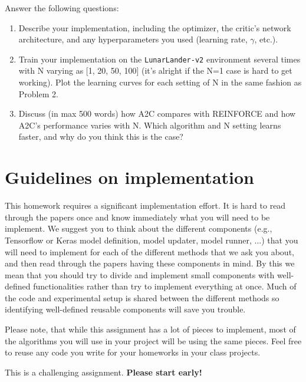 \documentclass[12pt]{article}
\begin{document}
Answer the following questions:
\begin{enumerate}
\item Describe your implementation, including the optimizer, the critic's network architecture, and any hyperparameters you used (learning rate, $\gamma$, etc.).

\item Train your implementation on the \texttt{LunarLander-v2} environment several times with N varying as [1, 20, 50, 100] (it's alright if the N=1 case is hard to get working). Plot the learning curves for each setting of N in the same fashion as Problem 2.

\item Discuss (in max 500 words) how A2C compares with REINFORCE and how A2C's performance varies with N. Which algorithm and N setting learns faster, and why do you think this is the case? 
\end{enumerate}

\section*{Guidelines on implementation}

This homework requires a significant implementation effort. It is hard to read through the papers once and know immediately what you will need to be implement. We suggest you to think about the different components (e.g., Tensorflow or Keras model definition, model updater, model runner, ...) that you will need to implement for each of the different methods that we ask you about, and then read through the papers having these components in mind. By this we mean that you should try to divide and implement small components with well-defined functionalities rather than try to implement everything at once. Much of the code and experimental setup is shared between the different methods so identifying well-defined reusable components will save you trouble.

Please note, that while this assignment has a lot of pieces to implement, most of the algorithms you will use in your project will be using the same pieces. Feel free to reuse any code you write for your homeworks in your class projects.

This is a challenging assignment. \textbf{Please start early!}
\end{document}
